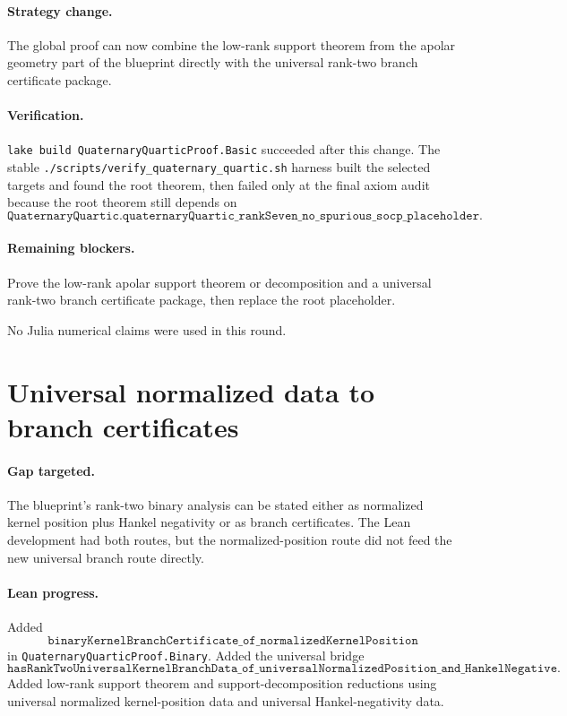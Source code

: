 \documentclass[11pt]{article}
\begin{document}
\paragraph{Strategy change.}
The global proof can now combine the low-rank support theorem from the apolar
geometry part of the blueprint directly with the universal rank-two branch
certificate package.

\paragraph{Verification.}
\texttt{lake build QuaternaryQuarticProof.Basic} succeeded after this change.
The stable \texttt{./scripts/verify\_quaternary\_quartic.sh} harness built the
selected targets and found the root theorem, then failed only at the final axiom
audit because the root theorem still depends on
\[
\texttt{QuaternaryQuartic.quaternaryQuartic\_rankSeven\_no\_spurious\_socp\_placeholder}.
\]

\paragraph{Remaining blockers.}
Prove the low-rank apolar support theorem or decomposition and a universal
rank-two branch certificate package, then replace the root placeholder.

No Julia numerical claims were used in this round.

\section*{Universal normalized data to branch certificates}

\paragraph{Gap targeted.}
The blueprint's rank-two binary analysis can be stated either as normalized
kernel position plus Hankel negativity or as branch certificates.  The Lean
development had both routes, but the normalized-position route did not feed the
new universal branch route directly.

\paragraph{Lean progress.}
Added
\[
\texttt{binaryKernelBranchCertificate\_of\_normalizedKernelPosition}
\]
in \texttt{QuaternaryQuarticProof.Binary}.  Added the universal bridge
\[
\texttt{hasRankTwoUniversalKernelBranchData\_of\_universalNormalizedPosition\_and\_HankelNegative}.
\]
Added low-rank support theorem and support-decomposition reductions using
universal normalized kernel-position data and universal Hankel-negativity data.
\end{document}
